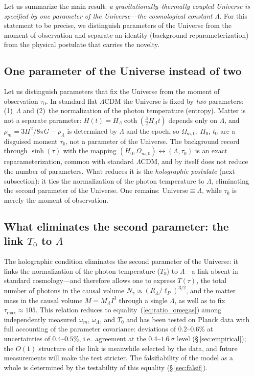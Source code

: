\documentclass[10pt,a4paper]{article}
\begin{document}
Let us summarize the main result: \emph{a gravitationally--thermally coupled Universe is specified by one parameter of the Universe---the cosmological constant $\Lambda$}. For this statement to be precise, we distinguish parameters of the Universe from the moment of observation and separate an identity (background reparameterization) from the physical postulate that carries the novelty.

\subsection{One parameter of the Universe instead of two}

Let us distinguish parameters that fix the Universe from the moment of observation $\tau_0$. In standard flat $\Lambda$CDM the Universe is fixed by \emph{two} parameters: (1)~$\Lambda$ and (2)~the normalization of the photon temperature (entropy). Matter is not a separate parameter: $H(t)=H_\Lambda\coth(\tfrac32 H_\Lambda t)$ depends only on $\Lambda$, and $\rho_m=3H^2/8\pi G-\rho_\Lambda$ is determined by $\Lambda$ and the epoch, so $\Omega_{m,0}$, $H_0$, $t_0$ are a disguised moment $\tau_0$, not a parameter of the Universe. The background record through $\sinh(\tau)$ with the mapping $(H_0,\Omega_{m,0})\leftrightarrow(\Lambda,\tau_0)$ is an exact reparameterization, common with standard $\Lambda$CDM, and by itself does not reduce the number of parameters. What reduces it is the \emph{holographic postulate} (next subsection): it ties the normalization of the photon temperature to $\Lambda$, eliminating the second parameter of the Universe. One remains: $\text{Universe}\equiv\Lambda$, while $\tau_0$ is merely the moment of observation.

\subsection{What eliminates the second parameter: the link $T_0$ to $\Lambda$}

The holographic condition eliminates the second parameter of the Universe: it links the normalization of the photon temperature ($T_0$) to $\Lambda$---a link absent in standard cosmology---and therefore allows one to express $T(\tau)$, the total number of photons in the causal volume $N_\gamma\propto(R_\Lambda/\ell_P)^{3/2}$, and the matter mass in the causal volume $M=M_\Lambda I^3$ through a single $\Lambda$, as well as to fix $\tau_{\max}\approx105$. This relation reduces to equality~(\ref{eq:ratio_omegas}) among independently measured $\omega_m$, $\omega_\Lambda$, and $T_0$ and has been tested on Planck data with full accounting of the parameter covariance: deviations of $0.2$--$0.6\%$ at uncertainties of $0.4$--$0.5\%$, i.e.\ agreement at the $0.4$--$1.6\,\sigma$ level (\S\,\ref{sec:empirical}); the $O(1)$ structure of the link is meanwhile selected by the data, and future measurements will make the test stricter. The falsifiability of the model as a whole is determined by the testability of this equality (\S\,\ref{sec:falsif}).
\end{document}
